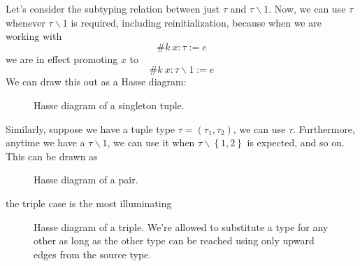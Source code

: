\documentclass[11pt,a4paper]{article}
\newcommand {\coo} [1] {\ensuremath{\operatorname{\mathsf{#1}}}}
\newcommand {\co} [1] {\coo{#1}}
\newcommand{\Rec}[1]{\left\{#1\right\}}
\newcommand{\Null}{\co{null}}
\begin{document}
\begin{enumerate}[label=\textbf{Excercise \arabic*\ }]
\begin{enumerate}
Let's consider the subtyping relation between just $\tau$ and $\tau \backslash 1$. Now, we can use $\tau$ whenever $\tau \backslash 1$ is required, including reinitialization, because when we are working with
$$
\#k~x:\tau := e
$$
we are in effect promoting $x$ to
$$
\#k~x:\tau\backslash 1 := e
$$
We can draw this out as a Hasse diagram:
\begin{figure}[H]
\centering
\caption{Hasse diagram of a singleton tuple.}
\end{figure}
Similarly, suppose we have a tuple type $\tau = (\tau_1,\tau_2)$, we can use $\tau$. Furthermore, anytime we have a $\tau\backslash 1$,  we can use it when $\tau \backslash\Rec{1,2}$ is expected, and so on. This can be drawn as
\begin{figure}[H]
\centering
\caption{Hasse diagram of a pair.}
\end{figure}

the triple case is the most illuminating
\begin{figure}[H]
\centering
\caption{Hasse diagram of a triple. We're allowed to substitute a type for any other as long as the other type can be reached using only upward edges from the source type.}
\end{figure}


\end{enumerate}
\end{enumerate}
\end{document}

